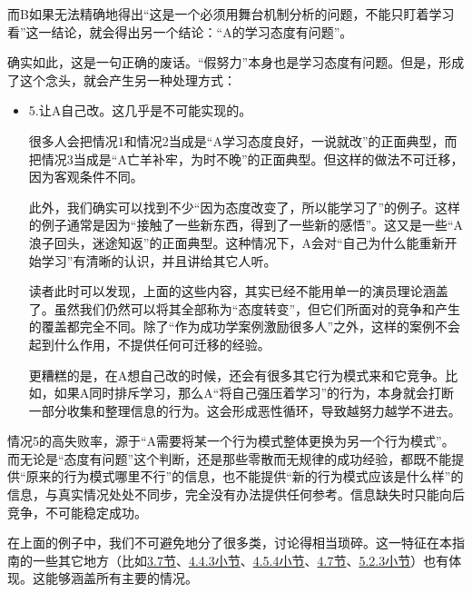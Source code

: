 而B如果无法精确地得出“这是一个必须用舞台机制分析的问题，不能只盯着学习看”这一结论，就会得出另一个结论：“A的学习态度有问题”。
\begin{explain}
确实如此，这是一句正确的废话。“假努力”本身也是学习态度有问题。但是，形成了这个念头，就会产生另一种处理方式：
\begin{itemize}
    \item 5.让A自己改。这几乎是不可能实现的。
    
    很多人会把情况1和情况2当成是“A学习态度良好，一说就改”的正面典型，而把情况3当成是“A亡羊补牢，为时不晚”的正面典型。但这样的做法不可迁移，因为客观条件不同。

    此外，我们确实可以找到不少“因为态度改变了，所以能学习了”的例子。这样的例子通常是因为“接触了一些新东西，得到了一些新的感悟”。这又是一些“A浪子回头，迷途知返”的正面典型。这种情况下，A会对“自己为什么能重新开始学习”有清晰的认识，并且讲给其它人听。

    读者此时可以发现，上面的这些内容，其实已经不能用单一的演员理论涵盖了。虽然我们仍然可以将其全部称为“态度转变”，但它们所面对的竞争和产生的覆盖都完全不同。除了“作为成功学案例激励很多人”之外，这样的案例不会起到什么作用，不提供任何可迁移的经验。

    更糟糕的是，在A想自己改的时候，还会有很多其它行为模式来和它竞争。比如，如果A同时排斥学习，那么A“将自己强压着学习”的行为，本身就会打断一部分收集和整理信息的行为。这会形成恶性循环，导致越努力越学不进去。
\end{itemize}
\insertparanotes
情况5的高失败率，源于“A需要将某一个行为模式整体更换为另一个行为模式”。而无论是“态度有问题”这个判断，还是那些零散而无规律的成功经验，都既不能提供“原来的行为模式哪里不行”的信息，也不能提供“新的行为模式应该是什么样”的信息，与真实情况处处不同步，完全没有办法提供任何参考。信息缺失时只能向后竞争，不可能稳定成功。
\end{explain}
\divider
在上面的例子中，我们不可避免地分了很多类，讨论得相当琐碎。这一特征在本指南的一些其它地方（比如\hyperref[sec:情绪、感受与其分析与处理方法]{3.7节}、\hyperref[sec:对竞争过程的解读]{4.4.3小节}、\hyperref[sec:指挥现象的一个实例解读]{4.5.4小节}、\hyperref[sec:日常沟通与社交]{4.7节}、\hyperref[sec:局部有效理论]{5.2.3小节}）也有体现。这能够涵盖所有主要的情况。

